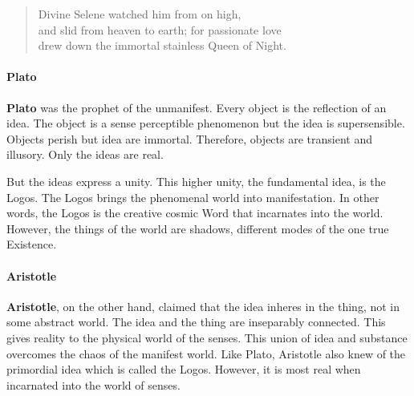 \begin{quotex}
\begin{verse}
Divine Selene watched him from on high,\\
and slid from heaven to earth; for passionate love\\
drew down the immortal stainless Queen of Night.
\end{verse}
\end{quotex}


\paragraph{Plato}


\textbf{Plato} was the prophet of the unmanifest. Every object is the reflection of an idea. The object is a sense perceptible phenomenon but the idea is supersensible. Objects perish but idea are immortal. Therefore, objects are transient and illusory. Only the ideas are real.

But the ideas express a unity. This higher unity, the fundamental idea, is the Logos. The Logos brings the phenomenal world into manifestation. In other words, the Logos is the creative cosmic Word that incarnates into the world. However, the things of the world are shadows, different modes of the one true Existence.

\paragraph{Aristotle}


\textbf{Aristotle}, on the other hand, claimed that the idea inheres in the thing, not in some abstract world. The idea and the thing are inseparably connected. This gives reality to the physical world of the senses. This union of idea and substance overcomes the chaos of the manifest world. Like Plato, Aristotle also knew of the primordial idea which is called the Logos. However, it is most real when incarnated into the world of senses.



